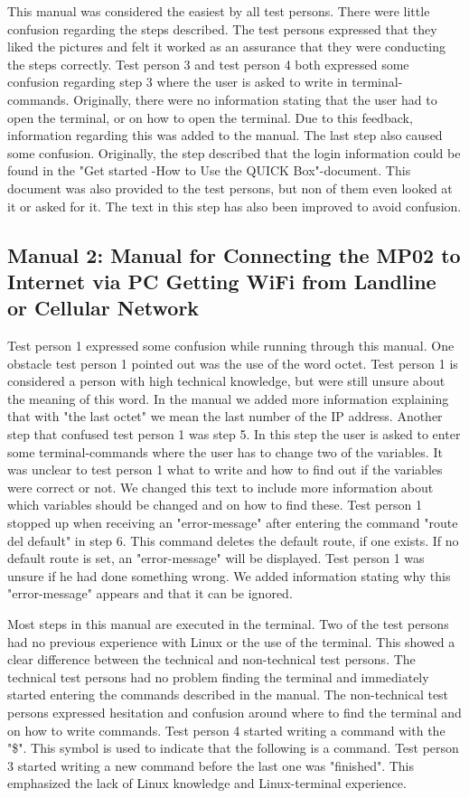 This manual was considered the easiest by all test persons. There were little confusion regarding the steps described. The test persons expressed that they liked the pictures and felt it worked as an assurance that they were conducting the steps correctly. Test person 3 and test person 4 both expressed some confusion regarding step 3 where the user is asked to write in terminal-commands. Originally, there were no information stating that the user had to open the terminal, or on how to open the terminal. Due to this feedback, information regarding this was added to the manual. The last step also caused some confusion. Originally, the step described that the login information could be found in the "Get started -How to Use the QUICK Box"-document. This document was also provided to the test persons, but non of them even looked at it or asked for it. The text in this step has also been improved to avoid confusion. 

\subsection{Manual 2: Manual for Connecting the MP02 to Internet via PC Getting WiFi from Landline or Cellular Network}
Test person 1 expressed some confusion while running through this manual. One obstacle test person 1 pointed out was the use of the word octet. Test person 1 is considered a person with high technical knowledge, but were still unsure about the meaning of this word. In the manual we added more information explaining that with "the last octet" we mean the last number of the IP address. Another step that confused test person 1 was step 5. In this step the user is asked to enter some terminal-commands where the user has to change two of the variables. It was unclear to test person 1 what to write and how to find out if the variables were correct or not. We changed this text to include more information about which variables should be changed and on how to find these. Test person 1 stopped up when receiving an "error-message" after entering the command "route del default" in step 6. This command deletes the default route, if one exists. If no default route is set, an "error-message" will be displayed. Test person 1 was unsure if he had done something wrong. We added information stating why this "error-message" appears and that it can be ignored. 

Most steps in this manual are executed in the terminal. Two of the test persons had no previous experience with Linux or the use of the terminal. This showed a clear difference between the technical and non-technical test persons. The technical test persons had no problem finding the terminal and immediately started entering the commands described in the manual. The non-technical test persons expressed hesitation and confusion around where to find the terminal and on how to write commands. Test person 4 started writing a command with the "\$". This symbol is used to indicate that the following is a command. Test person 3 started writing a new command before the last one was "finished". This emphasized the lack of Linux knowledge and Linux-terminal experience.   

